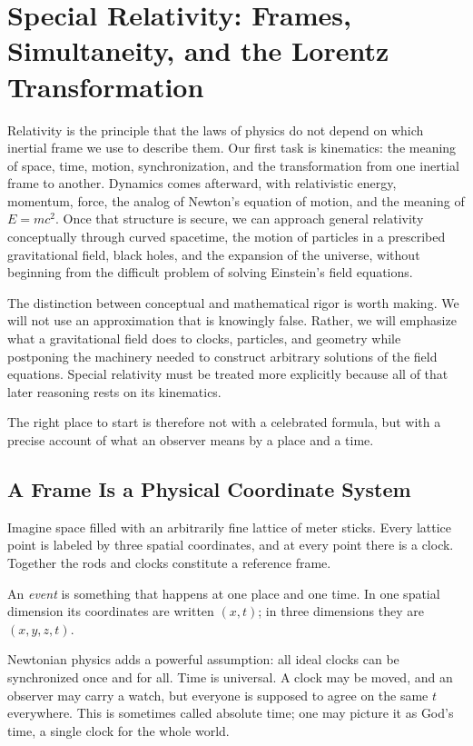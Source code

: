 \chapter{Special Relativity: Frames, Simultaneity, and the Lorentz Transformation}

Relativity is the principle that the laws of physics do not depend on which inertial frame we use to describe them. Our first task is kinematics: the meaning of space, time, motion, synchronization, and the transformation from one inertial frame to another. Dynamics comes afterward, with relativistic energy, momentum, force, the analog of Newton's equation of motion, and the meaning of \(E=mc^2\). Once that structure is secure, we can approach general relativity conceptually through curved spacetime, the motion of particles in a prescribed gravitational field, black holes, and the expansion of the universe, without beginning from the difficult problem of solving Einstein's field equations.

The distinction between conceptual and mathematical rigor is worth making. We will not use an approximation that is knowingly false. Rather, we will emphasize what a gravitational field does to clocks, particles, and geometry while postponing the machinery needed to construct arbitrary solutions of the field equations. Special relativity must be treated more explicitly because all of that later reasoning rests on its kinematics.

The right place to start is therefore not with a celebrated formula, but with a precise account of what an observer means by a place and a time.

\section{A Frame Is a Physical Coordinate System}

Imagine space filled with an arbitrarily fine lattice of meter sticks. Every lattice point is labeled by three spatial coordinates, and at every point there is a clock. Together the rods and clocks constitute a reference frame.

\begin{definition}
An \emph{event} is something that happens at one place and one time. In one spatial dimension its coordinates are written \((x,t)\); in three dimensions they are \((x,y,z,t)\).
\end{definition}

Newtonian physics adds a powerful assumption: all ideal clocks can be synchronized once and for all. Time is universal. A clock may be moved, and an observer may carry a watch, but everyone is supposed to agree on the same \(t\) everywhere. This is sometimes called absolute time; one may picture it as God's time, a single clock for the whole world.

